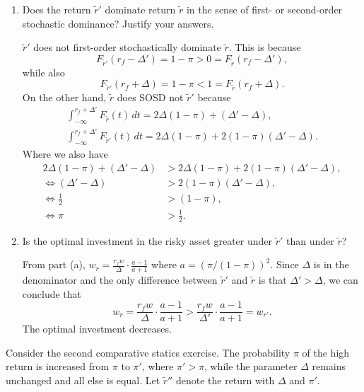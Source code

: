 \documentclass[11pt,english]{article}
\begin{document}
\begin{enumerate}
    \item[(b)] Does the return $\tilde{r}'$ dominate return $\tilde{r}$ in the
        sense of first- or second-order stochastic dominance? Justify your
        answers.
    \begin{solution}
$\tilde{r}'$ does not first-order stochastically dominate $\tilde{r}$. This is because $$F_{\tilde{r}'}(r_f - \Delta') = 1 - \pi > 0 = F_{\tilde{r}}(r_f - \Delta'),$$ while also $$F_{\tilde{r}'}(r_f + \Delta) = 1 - \pi < 1 = F_{\tilde{r}}(r_f + \Delta).$$ On the other hand, $\tilde{r}$ does SOSD not $\tilde{r}'$ because
\begin{align*}
\int_{-\infty}^{r_f + \Delta'}F_{\tilde{r}}(t) \,dt = 2\Delta(1 - \pi) + (\Delta' - \Delta),\\
 \int_{-\infty}^{r_f + \Delta'}F_{\tilde{r}'}(t) \,dt = 2\Delta(1 - \pi) + 2(1 - \pi)(\Delta' - \Delta).
\end{align*} Where we also have
\begin{align*}
2\Delta(1 - \pi) + (\Delta' - \Delta) &> 2\Delta(1 - \pi) + 2(1 - \pi)(\Delta' - \Delta),\\
\Longleftrightarrow (\Delta' - \Delta) &> 2(1 - \pi)(\Delta' - \Delta),\\
\Longleftrightarrow \frac{1}{2} &> (1 - \pi),\\
\Longleftrightarrow \pi &> \frac{1}{2}.
\end{align*}
    \end{solution}
 
    \item[(c)] Is the optimal investment in the risky asset greater under
        $\tilde{r}'$ than under $\tilde{r}$?
    \begin{solution}
 From part (a), $w_r = \frac{r_f w}{\Delta} \cdot \frac{a-1}{a+1}$ where $a =
(\pi/(1-\pi))^2$. Since $\Delta$ is in the denominator and the only difference between $\tilde{r}'$ and $\tilde{r}$ is that $\Delta' > \Delta$, we can conclude that $$w_r = \frac{r_f w}{\Delta} \cdot \frac{a-1}{a+1} > \frac{r_f w}{\Delta'} \cdot \frac{a-1}{a+1} = w_{r'}.$$ The optimal investment decreases.
    \end{solution}
\end{enumerate}
 
Consider the second comparative statics exercise. The probability $\pi$ of the
high return is increased from $\pi$ to $\pi'$, where $\pi' > \pi$, while the
parameter $\Delta$ remains unchanged and all else is equal. Let $\tilde{r}''$
denote the return with $\Delta$ and $\pi'$.
 
\end{document}
